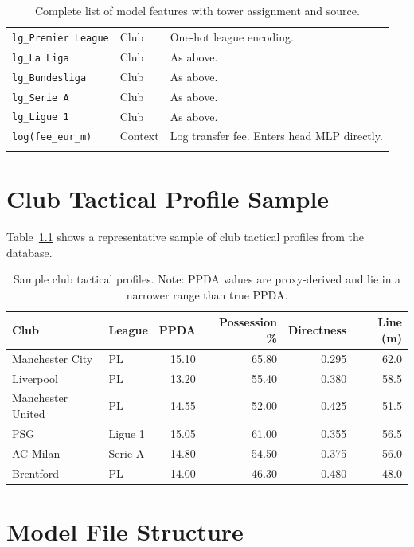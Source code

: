 \documentclass[12pt, a4paper, oneside]{report}
\begin{document}
\begin{longtable}{p{3.5cm} p{2cm} p{7.5cm}}
\texttt{lg\_Premier League}  & Club & One-hot league encoding. \\
\texttt{lg\_La Liga}         & Club & As above. \\
\texttt{lg\_Bundesliga}      & Club & As above. \\
\texttt{lg\_Serie A}         & Club & As above. \\
\texttt{lg\_Ligue 1}         & Club & As above. \\
\midrule
\texttt{log(fee\_eur\_m)}    & Context & Log transfer fee. Enters head MLP directly. \\
\bottomrule
\caption{Complete list of model features with tower assignment and source.}
\label{tab:full_features}
\end{longtable}

\chapter{Club Tactical Profile Sample}
\label{app:clubs}

Table~\ref{tab:club_sample} shows a representative sample of club tactical profiles from the database.

\begin{table}[H]
\centering
\caption{Sample club tactical profiles. Note: PPDA values are proxy-derived and lie in a narrower range than true PPDA.}
\label{tab:club_sample}
\begin{tabular}{llrrrr}
\toprule
\textbf{Club} & \textbf{League} & \textbf{PPDA} & \textbf{Possession \%} & \textbf{Directness} & \textbf{Line (m)} \\
\midrule
Manchester City   & PL         & 15.10 & 65.80 & 0.295 & 62.0 \\
Liverpool         & PL         & 13.20 & 55.40 & 0.380 & 58.5 \\
Manchester United & PL         & 14.55 & 52.00 & 0.425 & 51.5 \\
PSG               & Ligue 1    & 15.05 & 61.00 & 0.355 & 56.5 \\
AC Milan          & Serie A    & 14.80 & 54.50 & 0.375 & 56.0 \\
Brentford         & PL         & 14.00 & 46.30 & 0.480 & 48.0 \\
\bottomrule
\end{tabular}
\end{table}

\chapter{Model File Structure}
\label{app:files}
\end{document}
